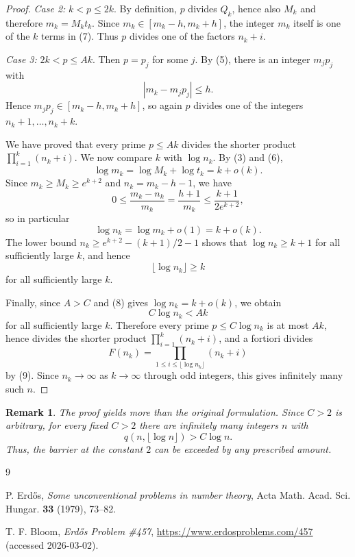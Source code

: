 \documentclass[11pt]{article}
\newtheorem{remark}[lemma]{Remark}
\begin{document}
\begin{proof}
\textit{Case 2:} $k<p\le 2k$. By definition, $p$ divides $Q_k$, hence also $M_k$ and therefore $m_k=M_kt_k$. Since $m_k\in [m_k-h,m_k+h]$, the integer $m_k$ itself is one of the $k$ terms in (7). Thus $p$ divides one of the factors $n_k+i$.

\textit{Case 3:} $2k<p\le Ak$. Then $p=p_j$ for some $j$. By (5), there is an integer $m_jp_j$ with
\[
|m_k-m_jp_j|\le h.
\]
Hence $m_jp_j\in [m_k-h,m_k+h]$, so again $p$ divides one of the integers $n_k+1,\dots,n_k+k$.

We have proved that every prime $p\le Ak$ divides the shorter product $\prod_{i=1}^k(n_k+i)$. We now compare $k$ with $\log n_k$. By (3) and (6),
\[
\log m_k=\log M_k+\log t_k=k+o(k).
\]
Since $m_k\ge M_k\ge e^{k+2}$ and $n_k=m_k-h-1$, we have
\[
0\le \frac{m_k-n_k}{m_k}=\frac{h+1}{m_k}\le \frac{k+1}{2e^{k+2}},
\]
so in particular
\begin{equation}
\log n_k=\log m_k+o(1)=k+o(k).
\end{equation}
The lower bound $n_k\ge e^{k+2}-(k+1)/2-1$ shows that $\log n_k\ge k+1$ for all sufficiently large $k$, and hence
\begin{equation}
\lfloor \log n_k\rfloor\ge k
\end{equation}
for all sufficiently large $k$.

Finally, since $A>C$ and (8) gives $\log n_k=k+o(k)$, we obtain
\[
C\log n_k<Ak
\]
for all sufficiently large $k$. Therefore every prime $p\le C\log n_k$ is at most $Ak$, hence divides the shorter product $\prod_{i=1}^k(n_k+i)$, and a fortiori divides
\[
F(n_k)=\prod_{1\le i\le \lfloor \log n_k\rfloor}(n_k+i)
\]
by (9). Since $n_k\to\infty$ as $k\to\infty$ through odd integers, this gives infinitely many such $n$.
\end{proof}

\begin{remark}
The proof yields more than the original formulation. Since $C>2$ is arbitrary, for every fixed $C>2$ there are infinitely many integers $n$ with
\[
q(n,\lfloor \log n\rfloor)>C\log n.
\]
Thus, the barrier at the constant $2$ can be exceeded by any prescribed amount.
\end{remark}

\begin{thebibliography}{9}

P. Erd\H{o}s, \textit{Some unconventional problems in number theory}, Acta Math. Acad. Sci. Hungar. \textbf{33} (1979), 73--82.

T. F. Bloom, \textit{Erd\H{o}s Problem \#457}, \url{https://www.erdosproblems.com/457} (accessed 2026-03-02).

\end{thebibliography}
\end{document}
